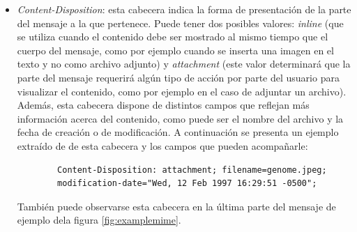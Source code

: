 \begin{itemize}
	\item\textit{Content-Disposition}: esta cabecera indica la forma de presentación de la parte del mensaje a la que pertenece. Puede tener dos posibles valores: \textit{inline} (que se utiliza cuando el contenido debe ser mostrado al mismo tiempo que el cuerpo del mensaje, como por ejemplo cuando se inserta una imagen en el texto y no como archivo adjunto) y \textit{attachment} (este valor determinará que la parte del mensaje requerirá algún tipo de acción por parte del usuario para visualizar el contenido, como por ejemplo en el caso de adjuntar un archivo). Además, esta cabecera dispone de distintos campos que reflejan más información acerca del contenido, como puede ser el nombre del archivo y la fecha de creación o de modificación. A continuación se presenta un ejemplo extraído de \cite{rfc2183} de esta cabecera y los campos que pueden acompañarle:
	
	\begin{lstlisting}
		Content-Disposition: attachment; filename=genome.jpeg;
		modification-date="Wed, 12 Feb 1997 16:29:51 -0500";
	\end{lstlisting}
	
	También puede observarse esta cabecera en la última parte del mensaje de ejemplo dela figura \ref{fig:examplemime}.
	

\end{itemize}
